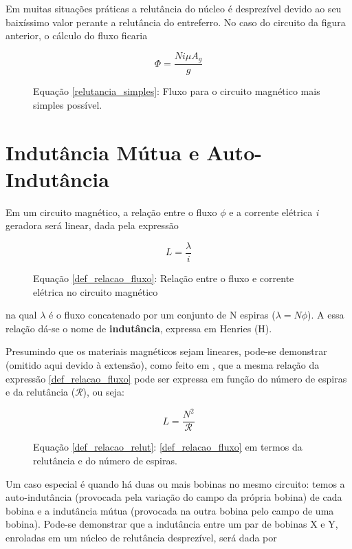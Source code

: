 \documentclass[]{report}
\begin{document}
Em muitas situações práticas a relutância do núcleo é desprezível devido ao seu baixíssimo valor perante a relutância do entreferro. No caso do circuito da figura anterior, o cálculo do fluxo ficaria

\begin{figure}[H]
\begin{equation}
\label{relutancia_simples}
\Phi = \frac{N i \mu A_g}{g}
\end{equation}
\caption*{Equação \ref{relutancia_simples}: Fluxo para o circuito magnético mais simples possível.}
\end{figure}

\chapter{Indutância Mútua e Auto-Indutância}

Em um circuito magnético, a relação entre o fluxo $\phi$ e a corrente elétrica \textit{i} geradora será linear, dada pela expressão
\begin{figure}[!ht]
\begin{equation}
\label{def_relacao_fluxo}
L = \frac{\lambda}{i}
\end{equation}
\caption*{Equação \ref{def_relacao_fluxo}: Relação entre o fluxo e corrente elétrica no circuito magnético}
\end{figure}

na qual $\lambda$ é o fluxo concatenado por um conjunto de N espiras ($\lambda = N \phi$). A essa relação dá-se o nome de \textbf{indutância}, expressa em Henries (H).

Presumindo que os materiais magnéticos sejam lineares, pode-se demonstrar (omitido aqui devido à extensão), como feito em \cite{fitzgerald}, que a mesma relação da expressão \ref{def_relacao_fluxo} pode ser expressa em função do número de espiras e da relutância ($\mathcal{R}$), ou seja:

\begin{figure}[!ht]
\begin{equation}
\label{def_relacao_relut}
L = \frac{N^2}{\mathcal{R}}
\end{equation}
\caption*{Equação \ref{def_relacao_relut}: \ref{def_relacao_fluxo} em termos da relutância e do número de espiras.}
\end{figure}

Um caso especial é quando há duas ou mais bobinas no mesmo circuito: temos a auto-indutância (provocada pela variação do campo da própria bobina) de cada bobina e a indutância mútua (provocada na outra bobina pelo campo de uma bobina). Pode-se demonstrar que a indutância entre um par de bobinas X e Y, enroladas em um núcleo de relutância desprezível, será dada por
\end{document}

